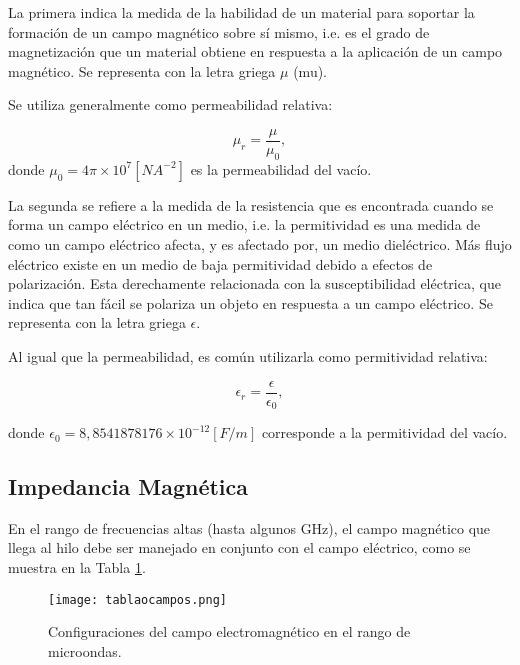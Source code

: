 \documentclass[12pt,letterpaper]{article}
\numberwithin{equation}{section}
\begin{document}
La primera indica la medida de la habilidad de un material para soportar la formación de un campo magnético sobre sí mismo, i.e. es el grado de magnetización que un material obtiene en respuesta a la aplicación de un campo magnético. Se representa con la letra griega $\mu$ (mu). 

Se utiliza generalmente como permeabilidad relativa:

\begin{equation}
\mu_{r}  = \frac{\mu}{\mu_{0}},
\end{equation}
donde $\mu_{0} = 4 \pi \times 10^7 [N A^{-2}]$ es la permeabilidad del vacío. 

La segunda se refiere a la medida de la resistencia que es encontrada cuando se forma un campo eléctrico en un medio, i.e. la permitividad es una medida de como un campo eléctrico afecta, y es afectado por, un medio dieléctrico. Más flujo eléctrico existe en un medio de baja permitividad debido a efectos de polarización. Esta derechamente relacionada con la susceptibilidad eléctrica, que indica que tan fácil se polariza un objeto en respuesta a un campo eléctrico. Se representa con la letra griega $\epsilon$.

Al igual que la permeabilidad, es común utilizarla como permitividad relativa:

\begin{equation}
\epsilon_{r}  = \frac{\epsilon}{\epsilon_{0}},
\end{equation}

\noindent donde $\epsilon_{0} = 8,8541878176 \times 10^{-12} [F/m]$ corresponde a la permitividad del vacío.

\subsection{Impedancia Magnética}

En el rango de frecuencias altas (hasta algunos GHz), el campo magnético que llega al hilo debe ser manejado en conjunto con el campo eléctrico, como se muestra en la Tabla \ref{fig: tablacampos}.

\begin{figure}[H]
	\centering\texttt{[image: tablaocampos.png]}
	\caption{Configuraciones del campo electromagnético en el rango de microondas.}
	\label{fig: tablacampos}
\end{figure} 
\end{document}
